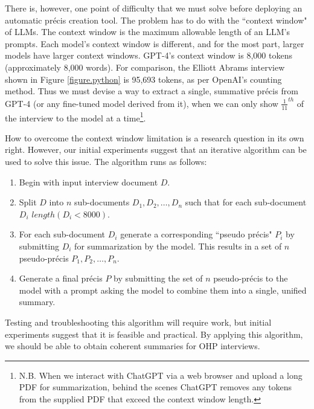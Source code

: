 \documentclass[12pt, oneside]{article}   	%
\begin{document}
There is, however, one point of difficulty that we must solve before deploying an automatic pr\'{e}cis creation tool.  The problem has to do with the ``context window" of LLMs.  The context window is  the maximum allowable length of an LLM's prompts.  Each model's context window is different, and for the most part, larger models have larger context windows.  GPT-4's context window is 8,000 tokens (approximately 8,000 words).  For comparison, the Elliott Abrams interview shown in Figure \ref{figure.python} is 95,693 tokens, as per OpenAI's counting method.  Thus we must devise a way to extract a single, summative pr\'{e}cis from GPT-4 (or any fine-tuned model derived from it), when we can only show $\frac{1}{11}^{th}$ of the interview to the model at a time\footnote{N.B. When we interact with ChatGPT via a web browser and upload a long PDF for summarization, behind the scenes ChatGPT removes any tokens from the supplied PDF that exceed the context window length.}.

How to overcome the context window limitation is  a  research question in its own right.  However, our initial experiments suggest that an iterative algorithm can be used to solve this issue.  The algorithm runs as follows:
\begin{enumerate}
\item Begin with input interview document $D$.
\item Split $D$ into $n$ sub-documents $D_1, D_2, \ldots, D_n$ such that  for each sub-document $D_i$ $length(D_i < 8000)$.
\item For each sub-document $D_i$ generate a corresponding ``pseudo pr\'{e}cis" $P_i$ by submitting $D_i$ for summarization by the model.  This results in a set of $n$ pseudo-pr\'{e}cis $P_1, P_2, \ldots, P_n$.
\item Generate a final pr\'{e}cis $P$ by submitting the set of $n$ pseudo-pr\'{e}cis to the model with a prompt asking the model to combine them into a single, unified summary.
\end{enumerate}
Testing and troubleshooting this algorithm will require  work, but initial experiments suggest that it is feasible and practical.  By applying this algorithm, we should be able to obtain coherent summaries for OHP interviews.
\end{document}
